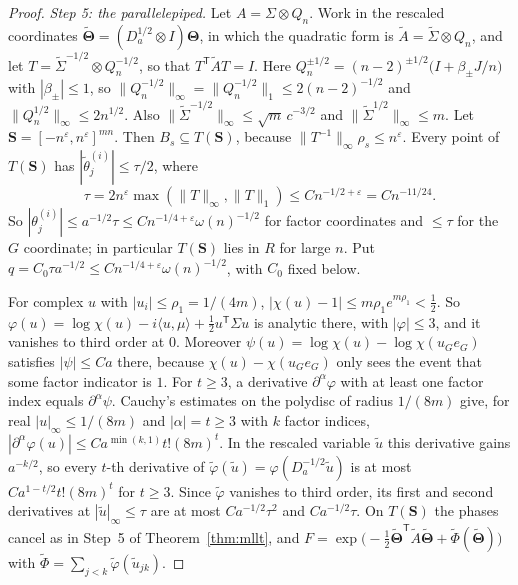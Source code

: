 \documentclass[11pt]{article}
\begin{document}
\begin{proof}
\emph{Step 5: the parallelepiped.}
Let \(A=\Sigma\otimes Q_n\). Work in the rescaled coordinates
\(\tilde{\boldsymbol\Theta}=(D_a^{1/2}\otimes I)\boldsymbol\Theta\), in which the quadratic
form is \(\tilde A=\tilde\Sigma\otimes Q_n\), and let
\(T=\tilde\Sigma^{-1/2}\otimes Q_n^{-1/2}\), so that \(T^{\mathsf T}\tilde AT=I\). Here
\(Q_n^{\pm1/2}=(n-2)^{\pm1/2}\bigl(I+\beta_\pm J/n\bigr)\) with
\(|\beta_\pm|\le1\), so
\(\|Q_n^{-1/2}\|_{\infty}=\|Q_n^{-1/2}\|_1\le2(n-2)^{-1/2}\) and
\(\|Q_n^{1/2}\|_\infty\le2n^{1/2}\). Also
\(\|\tilde\Sigma^{-1/2}\|_\infty\le\sqrt m\,c^{-3/2}\) and \(\|\tilde\Sigma^{1/2}\|_\infty\le m\).
Let \(\boldsymbol S=[-n^\varepsilon,n^\varepsilon]^{mn}\).
Then \(B_s\subseteq T(\boldsymbol S)\), because \(\|T^{-1}\|_\infty\rho_s\le n^\varepsilon\).
Every point of \(T(\boldsymbol S)\) has \(|\tilde\theta^{(i)}_j|\le\tau/2\), where
\[
\tau=2n^\varepsilon\max(\|T\|_\infty,\|T\|_1)\le Cn^{-1/2+\varepsilon}=Cn^{-11/24}.
\]
So \(|\theta^{(i)}_j|\le a^{-1/2}\tau\le Cn^{-1/4+\varepsilon}\omega(n)^{-1/2}\) for factor
coordinates and \(\le\tau\) for the \(G\) coordinate; in particular
\(T(\boldsymbol S)\) lies in \(R\) for large \(n\). Put
\(q=C_0\tau a^{-1/2}\le Cn^{-1/4+\varepsilon}\omega(n)^{-1/2}\), with \(C_0\) fixed below.

For complex \(u\) with \(|u_i|\le\rho_1=1/(4m)\),
\(|\chi(u)-1|\le m\rho_1e^{m\rho_1}<\frac12\). So
\(\varphi(u)=\log\chi(u)-i\langle u,\mu\rangle+\frac12u^{\mathsf T}\Sigma u\) is
analytic there, with \(|\varphi|\le3\), and it vanishes to third order at \(0\).
Moreover \(\psi(u)=\log\chi(u)-\log\chi(u_Ge_G)\) satisfies \(|\psi|\le Ca\) there, because
\(\chi(u)-\chi(u_Ge_G)\) only sees the event that some factor indicator is \(1\).
For \(t\ge3\), a derivative \(\partial^\alpha\varphi\) with at least one factor index
equals \(\partial^\alpha\psi\). Cauchy's estimates on the polydisc of radius \(1/(8m)\)
give, for real \(|u|_\infty\le1/(8m)\) and \(|\alpha|=t\ge3\) with \(k\) factor indices,
\(|\partial^\alpha\varphi(u)|\le Ca^{\min(k,1)}t!(8m)^t\).
In the rescaled variable \(\tilde u\) this derivative gains \(a^{-k/2}\), so every
\(t\)-th derivative of \(\tilde\varphi(\tilde u)=\varphi(D_a^{-1/2}\tilde u)\) is at most
\(Ca^{1-t/2}t!(8m)^t\) for \(t\ge3\). Since \(\tilde\varphi\) vanishes to third order,
its first and second derivatives at \(|\tilde u|_\infty\le\tau\) are at most
\(Ca^{-1/2}\tau^2\) and \(Ca^{-1/2}\tau\).
On \(T(\boldsymbol S)\) the phases cancel as in Step~5 of
Theorem~\ref{thm:mllt}, and
\(F=\exp\bigl(-\frac12\tilde{\boldsymbol\Theta}^{\mathsf T}\tilde A\tilde{\boldsymbol\Theta}+\tilde\Phi(\tilde{\boldsymbol\Theta})\bigr)\)
with \(\tilde\Phi=\sum_{j<k}\tilde\varphi(\tilde u_{jk})\).


\end{proof}
\end{document}
